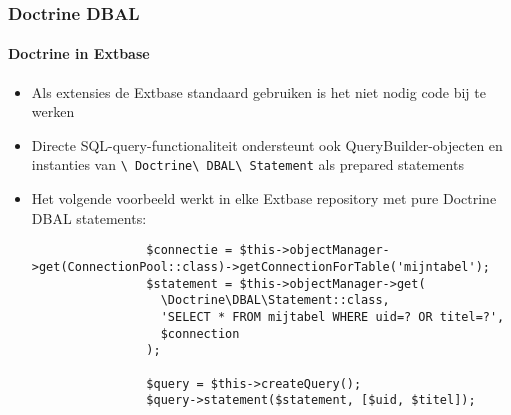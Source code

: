 \begin{frame}[fragile]
	\frametitle{Doctrine DBAL}
	\framesubtitle{Doctrine in Extbase}

	\lstset{basicstyle=\tiny\ttfamily}

	\begin{itemize}
		\item Als extensies de Extbase standaard gebruiken is het niet nodig code bij te werken

		\item Directe SQL-query-functionaliteit ondersteunt ook QueryBuilder-objecten en instanties van
			\texttt{\textbackslash
			Doctrine\textbackslash
			DBAL\textbackslash
			Statement} als prepared statements
		\item Het volgende voorbeeld werkt in elke Extbase repository met pure Doctrine DBAL statements:

			\begin{lstlisting}
				$connectie = $this->objectManager->get(ConnectionPool::class)->getConnectionForTable('mijntabel');
				$statement = $this->objectManager->get(
				  \Doctrine\DBAL\Statement::class,
				  'SELECT * FROM mijtabel WHERE uid=? OR titel=?',
				  $connection
				);

				$query = $this->createQuery();
				$query->statement($statement, [$uid, $titel]);
			\end{lstlisting}
	\end{itemize}

\end{frame}

